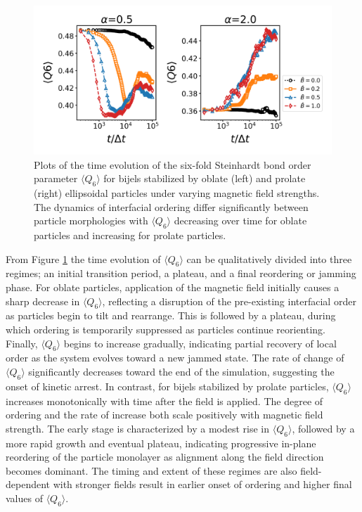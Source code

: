 \begin{figure} 
    \centering 
    \includegraphics[scale=0.6]{../figures/results/paper2/Q6-field_on.png} 
    \caption{Plots of the time evolution of the six-fold Steinhardt bond order parameter \(\langle Q_6 \rangle\) for bijels 
             stabilized by oblate (left) and prolate (right) ellipsoidal particles under varying magnetic field strengths. The dynamics of interfacial ordering differ 
             significantly between particle morphologies with \(\langle Q_6 \rangle\) decreasing over time for oblate particles and increasing for prolate particles.} 
    \label{fig:Q6-field_on} 
\end{figure}

From Figure \ref{fig:Q6-field_on} the time evolution of \(\langle Q_6 \rangle\) can be qualitatively divided into three regimes;
an initial transition period, a plateau, and a final reordering or jamming phase.
For oblate particles, application of the magnetic field initially causes a sharp decrease in \(\langle Q_6 \rangle\), reflecting a disruption of the 
pre-existing interfacial order as particles begin to tilt and rearrange. This is followed by a plateau, during which ordering is temporarily suppressed 
as particles continue reorienting. Finally, \(\langle Q_6 \rangle\) begins to increase gradually, indicating partial recovery of local order as the system 
evolves toward a new jammed state. The rate of change of \(\langle Q_6 \rangle\) significantly decreases toward the end of the simulation, suggesting the onset 
of kinetic arrest. In contrast, for bijels stabilized by prolate particles, \(\langle Q_6 \rangle\) increases monotonically with time after the field is applied. The degree 
of ordering and the rate of increase both scale positively with magnetic field strength. The early stage is characterized by a modest rise in \(\langle Q_6 \rangle\), 
followed by a more rapid growth and eventual plateau, indicating progressive in-plane reordering of the particle monolayer as alignment along the field direction 
becomes dominant. The timing and extent of these regimes are also field-dependent with stronger fields result in earlier onset of ordering and higher final values 
of \(\langle Q_6 \rangle\).

